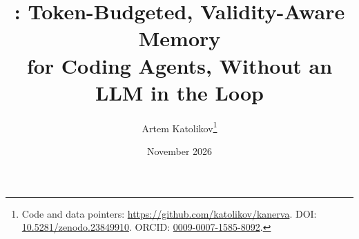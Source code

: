 \documentclass[10pt,twocolumn]{article}
\title{\kanerva: Token-Budgeted, Validity-Aware Memory\\for Coding Agents, Without an LLM in the Loop}
\author{Artem Katolikov\thanks{Code and data pointers: \url{https://github.com/katolikov/kanerva}. DOI: \href{https://doi.org/10.5281/zenodo.23849910}{10.5281/zenodo.23849910}. ORCID: \href{https://orcid.org/0009-0007-1585-8092}{0009-0007-1585-8092}.}}
\date{November 2026}
\begin{document}
\maketitle







\clearpage






\appendix
\onecolumn

\end{document}
